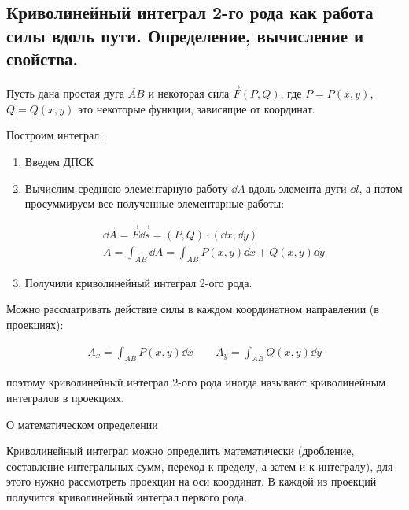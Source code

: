 \subsection{%
  Криволинейный интеграл 2-го рода как работа силы вдоль пути. Определение,
  вычисление и свойства.%
}

Пусть дана простая дуга \(\breve{AB}\) и некоторая сила \(\vec{F}(P, Q)\), где
\(P = P(x, y)\), \(Q = Q(x, y)\) это некоторые функции, зависящие от координат.

Построим интеграл:
\begin{enumerate}
  \item Введем ДПСК
  \item Вычислим среднюю элементарную работу \(\dd A\) вдоль элемента дуги
  \(\dd l\), а потом просуммируем все полученные элементарные работы:
  
  \begin{twocolumns}
    \begin{align*}
      \dd A = \vec{F} \vec{\dd s} = (P, Q) \cdot (\dd x, \dd y) \\
      A = \int_{AB} \dd A = \int_{AB} P(x, y) \dd x + Q(x, y) \dd y
    \end{align*}
    \columnbreak

    
  \end{twocolumns}

  \item Получили криволинейный интеграл 2-ого рода.
\end{enumerate}

\begin{remark}
  Можно рассматривать действие силы в каждом координатном направлении
  (в проекциях):

  \begin{align*}
    A_{x} = \int_{AB} P(x, y) \dd x \qquad
    A_{y} = \int_{AB} Q(x, y) \dd y
  \end{align*}

  поэтому криволинейный интеграл 2-ого рода иногда называют криволинейным
  интегралов в проекциях.
\end{remark}

\begin{remark}
  О математическом определении

  Криволинейный интеграл можно определить математически (дробление, составление
  интегральных сумм, переход к пределу, а затем и к интегралу), для этого нужно
  рассмотреть проекции на оси координат. В каждой из проекций получится
  криволинейный интеграл первого рода.
\end{remark}

